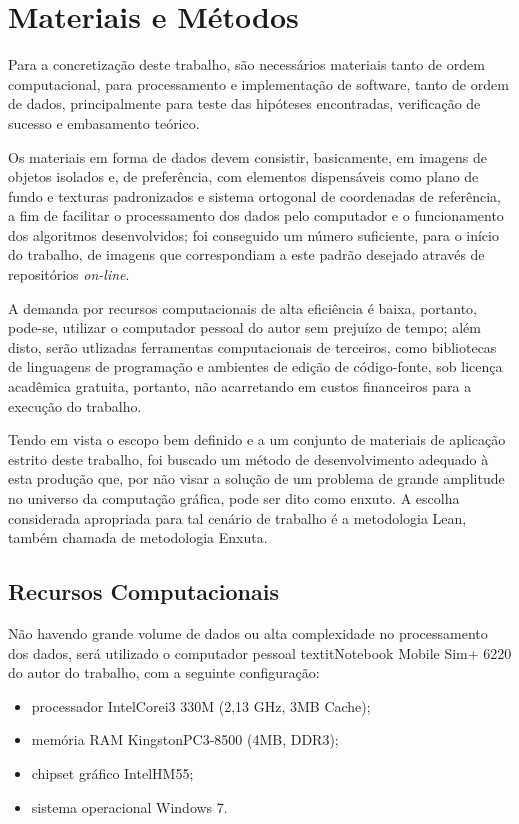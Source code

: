 \chapter{Materiais e Métodos}
	\label{materiaisEMetodos}

	Para a concretização deste trabalho, são necessários materiais tanto de ordem computacional, para processamento e implementação de software, tanto de ordem de dados, principalmente para teste das hipóteses encontradas, verificação de sucesso e embasamento teórico. 
	
	Os materiais em forma de dados devem consistir, basicamente, em imagens de objetos isolados e, de preferência, com elementos dispensáveis como plano de fundo e texturas padronizados e sistema ortogonal de coordenadas de referência, a fim de facilitar o processamento dos dados pelo computador e o funcionamento dos algoritmos desenvolvidos; foi conseguido um número suficiente, para o início do trabalho, de imagens que correspondiam a este padrão desejado através de repositórios \textit{on-line}. 
	
	A demanda por recursos computacionais de alta eficiência é baixa, portanto, pode-se, utilizar o computador pessoal do autor sem prejuízo de tempo; além disto, serão utlizadas ferramentas computacionais de terceiros, como bibliotecas de linguagens de programação e ambientes de edição de código-fonte, sob licença acadêmica gratuita, portanto, não acarretando em custos financeiros para a execução do trabalho.
	
	Tendo em vista o escopo bem definido e a um conjunto de materiais de aplicação estrito deste trabalho, foi buscado um método de desenvolvimento adequado à esta produção que, por não visar a solução de um problema de grande amplitude no universo da computação gráfica, pode ser dito como enxuto. A escolha considerada apropriada para tal cenário de trabalho é a metodologia Lean, também chamada de metodologia Enxuta.
	
\section{Recursos Computacionais}

	Não havendo grande volume de dados ou alta complexidade no processamento dos dados, será utilizado o computador pessoal textit{Notebook} Mobile Sim+ 6220 do autor do trabalho, com a seguinte configuração:
\begin{itemize}
	\item processador Intel\textregistered Core\textregistered i3 330M (2,13 GHz, 3MB Cache);
	\item memória RAM Kingston\textregistered PC3-8500 (4MB, DDR3);
	\item chipset gráfico Intel\textregistered HM55;
	\item sistema operacional Windows 7\textregistered.
\end{itemize}

